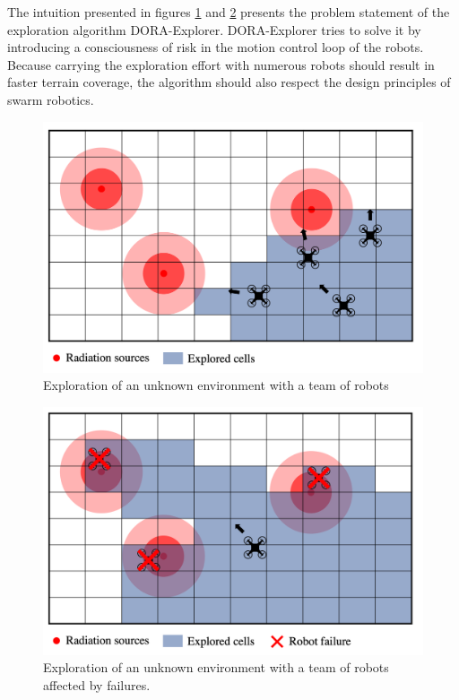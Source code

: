 The intuition presented in figures \ref{statementDORA1} and \ref{statementDORA2} presents the problem statement of the exploration algorithm DORA-Explorer. DORA-Explorer tries to solve it by introducing a consciousness of risk in the motion control loop of the robots. Because carrying the exploration effort with numerous robots should result in faster terrain coverage, the algorithm should also respect the design principles of swarm robotics.

\begin{figure}[H]
	\centering
    \includegraphics[width=0.85\columnwidth]{images/problemStatement1.png}
    \caption{Exploration of an unknown environment with a team of robots}
    \label{statementDORA1}
\end{figure}

\begin{figure}[H]
	\centering
    \includegraphics[width=0.85\columnwidth]{images/problemStatement2.png}
    \caption{Exploration of an unknown environment with a team of robots affected by failures.}
    \label{statementDORA2}
\end{figure}


